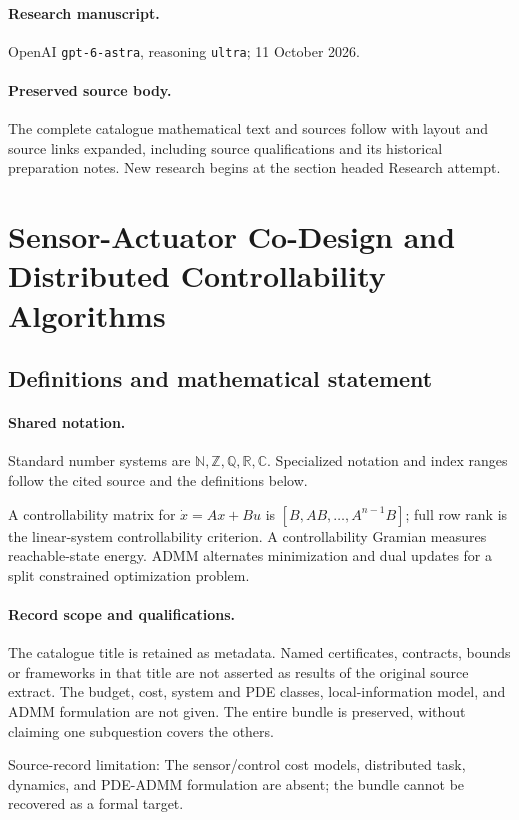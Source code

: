 \documentclass[11pt]{article}
\begin{document}
\paragraph{Research manuscript.} OpenAI \texttt{gpt-6-astra}, reasoning \texttt{ultra}; 11 October 2026.
\paragraph{Preserved source body.} The complete catalogue mathematical text and sources follow with layout and source links expanded, including source qualifications and its historical preparation notes. New research begins at the section headed Research attempt.

\section{Sensor-Actuator Co-Design and Distributed Controllability Algorithms}\label{statement}

\subsection{Definitions and mathematical statement}

\paragraph{Shared notation.}Standard number systems are $\mathbb N,\mathbb Z,\mathbb Q,\mathbb R,\mathbb C$. Specialized notation and index ranges follow the cited source and the definitions below.


A controllability matrix for $\dot x=Ax+Bu$ is $[B,AB,\ldots,A^{n-1}B]$; full row rank is the linear-system controllability criterion. A controllability Gramian measures reachable-state energy. ADMM alternates minimization and dual updates for a split constrained optimization problem.
\paragraph{Record scope and qualifications.}
The catalogue title is retained as metadata. Named certificates, contracts, bounds or frameworks in that title are not asserted as results of the original source extract.
The budget, cost, system and PDE classes, local-information model, and ADMM formulation are not given. The entire bundle is preserved, without claiming one subquestion covers the others.

Source-record limitation: The sensor/control cost models, distributed task, dynamics, and PDE-ADMM formulation are absent; the bundle cannot be recovered as a formal target.
\end{document}
